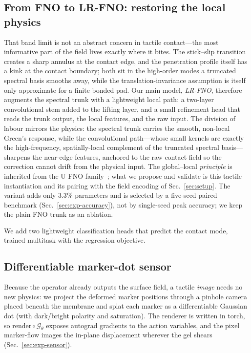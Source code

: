 \documentclass[conference]{IEEEtran}
\begin{document}
\subsection{From FNO to LR-FNO: restoring the local physics}
\label{sec:method-lrfno}
That band limit is not an abstract concern in tactile contact---the most
informative part of the field lives exactly where it bites. The stick--slip
transition creates a sharp annulus at the contact edge, and the penetration
profile itself has a kink at the contact boundary; both sit in the high-order
modes a truncated spectral basis smooths away, while the translation-invariance
assumption is itself only approximate for a finite bonded pad. Our main model,
\emph{LR-FNO}, therefore augments the spectral trunk with a lightweight local
path: a two-layer convolutional stem added to the lifting layer, and a small
refinement head that reads the trunk output, the local features, and the raw
input. The division of labour mirrors the physics: the spectral trunk carries
the smooth, non-local Green's response, while the convolutional path---whose
small kernels are exactly the high-frequency, spatially-local complement of the
truncated spectral basis---sharpens the near-edge features, anchored to the raw
contact field so the correction cannot drift from the physical input. The
global--local \emph{principle} is inherited from the U-FNO
family~\cite{wen2022ufno}; what we propose and validate is this tactile
instantiation and its pairing with the field encoding of Sec.~\ref{sec:setup}.
The variant adds only $3.3\%$ parameters and is selected by a five-seed paired
benchmark (Sec.~\ref{sec:exp-accuracy}), not by single-seed peak accuracy; we
keep the plain FNO trunk as an ablation.

We add two lightweight classification heads that predict the contact mode, trained
multitask with the regression objective.

\subsection{Differentiable marker-dot sensor}\label{sec:method-sensor}
Because the operator already outputs the surface field, a tactile \emph{image}
needs no new physics: we project the deformed marker positions through a pinhole
camera placed beneath the membrane and splat each marker as a differentiable
Gaussian dot (with dark/bright polarity and saturation). The renderer is written in
torch, so $\mathrm{render}\circ\mathcal{G}_\theta$ exposes autograd gradients to
the action variables, and the pixel marker-flow images the in-plane displacement wherever the gel shears
(Sec.~\ref{sec:exp-sensor}).
\end{document}
